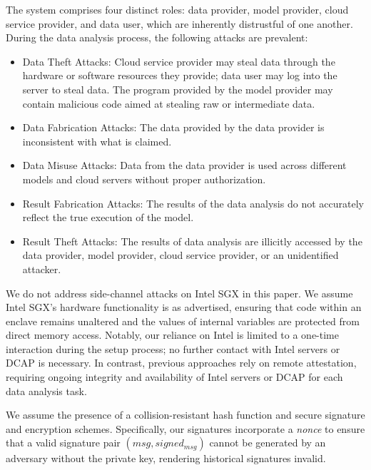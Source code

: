 The system comprises four distinct roles: data provider, model provider, cloud service provider, and data user, which are inherently distrustful of one another.
During the data analysis process, the following attacks are prevalent:
\begin{itemize}
    \item Data Theft Attacks: Cloud service provider may steal data through the hardware or software resources they provide; data user may log into the server to steal data. The program provided by the model provider may contain malicious code aimed at stealing raw or intermediate data.
    \item Data Fabrication Attacks: The data provided by the data provider is inconsistent with what is claimed.
    \item Data Misuse Attacks: Data from the data provider is used across different models and cloud servers without proper authorization.
    \item Result Fabrication Attacks: The results of the data analysis do not accurately reflect the true execution of the model.
    \item Result Theft Attacks: The results of data analysis are illicitly accessed by the data provider, model provider, cloud service provider, or an unidentified attacker.
\end{itemize}

We do not address side-channel attacks on Intel SGX in this paper. We assume Intel SGX's hardware functionality is as advertised, ensuring that code within an enclave remains unaltered and the values of internal variables are protected from direct memory access. Notably, our reliance on Intel is limited to a one-time interaction during the setup process; no further contact with Intel servers or DCAP is necessary. In contrast, previous approaches rely on remote attestation, requiring ongoing integrity and availability of Intel servers or DCAP for each data analysis task.

We assume the presence of a collision-resistant hash function and secure signature and encryption schemes. Specifically, our signatures incorporate a \textit{nonce} to ensure that a valid signature pair $(msg, signed_{msg})$ cannot be generated by an adversary without the private key, rendering historical signatures invalid.


